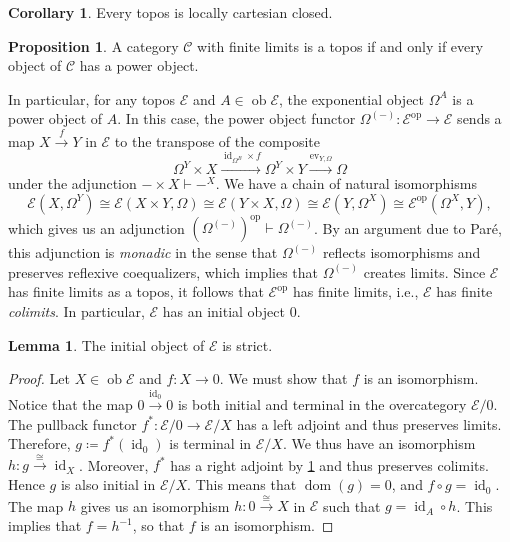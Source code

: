 \documentclass[10pt,letterpaper,cm]{nupset}
\theoremstyle{definition}
\theoremstyle{theorem}
\newtheorem{lemma}[definition]{Lemma}
\newtheorem{corollary}[definition]{Corollary}
\newtheorem{prop}[definition]{Proposition}
\theoremstyle{remark}
\newcommand{\1}{\mathbf{1}}
\renewcommand{\c}{\mathscr{C}}
\newcommand{\e}{\mathscr{E}}
\newcommand{\0}{\vec 0}
\DeclareMathOperator*{\ev}{ev}
\DeclareMathOperator{\id}{id}
\DeclareMathOperator{\op}{op}
\DeclareMathOperator{\ob}{ob}
\DeclareMathOperator{\dom}{dom}
\begin{document}
\begin{corollary}\label{tlcc}
Every topos is locally cartesian closed.
\end{corollary}

\begin{prop}\label{power}
A category $\c$ with finite limits is a topos if and only if every object of $\c$ has a power object. 
\end{prop}

In particular, for any topos $\e$ and $A\in \ob{\e}$, the exponential object $\Omega^A$ is a power object of $A$. In this case, the power object functor $\Omega^{\left({-}\right)} : \e^{\op} \to \e$ sends a map  $X \xrightarrow{f} Y$ in $\e$ to the transpose of the composite 
\[
\Omega^Y \times X \xrightarrow{\id_{\Omega^B} \times f}  \Omega^{Y} \times Y \xrightarrow{\ev_{Y, \Omega}} \Omega
\] under the adjunction ${-} \times X \vdash {-}^X$. We have a chain of natural isomorphisms
\[
\e(X, \Omega^Y) \cong \e(X \times Y, \Omega) \cong \e(Y \times X, \Omega) \cong \e(Y, \Omega^X) \cong \e^{\op}(\Omega^X, Y)
,\] which gives us an adjunction $\left(\Omega^{\left({-}\right)}\right)^{\op} \vdash \Omega^{\left({-}\right)}$. 
By an argument due to Par\'e, this adjunction is \textit{monadic} in the sense that $\Omega^{\left({-}\right)}$ reflects isomorphisms and preserves reflexive coequalizers, which implies that $\Omega^{\left({-}\right)}$ creates limits. Since $\e$ has finite limits as a topos, it follows that $\e^{\op}$ has finite limits, i.e., $\e$ has finite \emph{colimits}. In particular, $\e$ has an initial object $0$. 

\begin{lemma}
The initial object of $\e$ is strict.
\end{lemma} 
\begin{proof}
Let $X \in \ob{\e}$ and $f : X \to 0$. We must show that $f$ is an isomorphism. Notice that the map $0 \xrightarrow{\id_0} 0$ is both initial and terminal in the overcategory ${\e}/{0}$. The pullback functor $f^{\ast} : {\e}/{0} \to {\e}/{X}$ has a left adjoint and thus preserves limits. Therefore, $g \coloneqq f^{\ast}(\id_0)$ is terminal in ${\e}/{X}$. We thus have an isomorphism $h : g \xrightarrow{\cong} \id_X$. Moreover, $f^{\ast}$ has a right adjoint by \cref{tlcc} and thus preserves colimits. Hence $g$ is also initial in ${\e}/X$. This means that $\dom(g) =0$, and $f \circ g = \id_0$. The map $h$ gives us an isomorphism $ h: 0 \xrightarrow{\cong} X$ in $\e$ such that $g = \id_A \circ h$. This implies that  $f = h^{-1}$, so that $f$ is an isomorphism. 
\end{proof}
\end{document}
